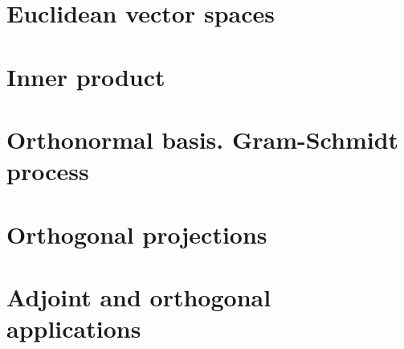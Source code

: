 
\section{Euclidean vector spaces}
\section{Inner product}
\section{Orthonormal basis. Gram-Schmidt process}
\section{Orthogonal projections}
\section{Adjoint and orthogonal applications}
